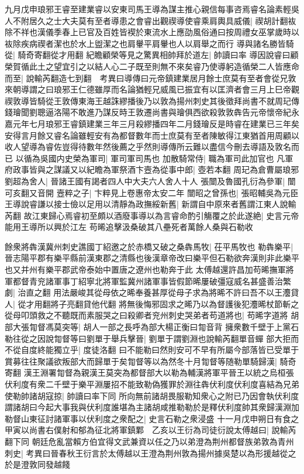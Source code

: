 九月戊申琅邪王睿至建業睿以安東司馬王導為謀主推心親信每事咨焉睿名論素輕吳人不附居久之士大夫莫有至者導患之會睿出觀禊導使睿乘肩輿具威儀|{
	禊胡計翻䘠除不祥也漢儀季春上已官及百姓皆褉於東流水上應劭風俗通曰按周禮女巫掌歲時以䘠除疾病禊者潔也於水上盥潔之也肩轝平肩轝也人以肩舉之而行}
導與諸名勝皆騎從|{
	騎奇寄翻從才用翻}
紀瞻顧榮等見之驚異相帥拜於道左|{
	帥讀曰率}
導因說睿曰顧榮賀循此土之望宜引之以結人心二子既至則無不來矣睿乃使導躬造循榮二人皆應命而至|{
	說輸芮翻造七到翻　考異曰導傳曰元帝鎮建業居月餘士庶莫有至者會從兄敦來朝導謂之曰琅邪王仁德雖厚而名論猶輕兄威風已振宜有以匡濟者會三月上巳帝觀禊敦導皆騎從王敦傳東海王越誅繆播後乃以敦為揚州刺史其後徵拜尚書不就周玘傳錢璯聞劉聰逼洛陽不敢進乃謀反時王敦遷尚書與璯俱西欲殺敦敦犇告元帝懷帝紀永嘉元年七月琅邪王睿鎮建業三年三月殺繆播四年二月錢璯反是時睿在建業已三年矣安得言月餘又睿名論雖輕安有為都督數年而士庶莫有至者陳敏得江東猶首用周顧以收人望導為睿佐豈得待數年然後薦之乎然則導傳所云難以盡信今刪去導語及敦名而已}
以循為吳國内史榮為軍司|{
	軍司軍司馬也}
加散騎常侍|{
	職為軍司此加官也}
凡軍府政事皆與之謀議又以紀瞻為軍祭酒卞壼為從事中郎|{
	壺若本翻}
周玘為倉曹屬琅邪劉超為舍人|{
	晉諸王國有謁者四人中大夫六人舍人十人}
張闓及魯國孔衍為參軍|{
	闓可亥翻又音開}
壼粹之子|{
	卞粹見上卷惠帝太安二年}
闓昭之曾孫也|{
	張昭輔吳為元臣}
王導說睿謙以接士儉以足用以清靜為政撫綏新舊|{
	新謂自中原來者舊謂江東人說輸芮翻}
故江東歸心焉睿初至頗以酒廢事導以為言睿命酌引觴覆之於此遂絶|{
	史言元帝能用王導所以興於江左}
苟晞追擊汲桑破其八壘死者萬餘人桑與石勒收

餘衆將犇漢冀州刺史譙國丁紹邀之於赤橋又破之桑犇馬牧|{
	茌平馬牧也}
勒犇樂平|{
	晉志陽平郡有樂平縣前漢東郡之清縣也後漢章帝改曰樂平但石勒欲奔漢則非此樂平也又并州有樂平郡武帝泰始中置唐之遼州也勒奔于此}
太傅越還許昌加苟晞撫軍將軍都督青兖諸軍事丁紹寧北將軍監冀州諸軍事皆假節晞屢破彊寇威名甚盛善治繁劇|{
	治直之翻}
用法嚴峻其從母依之晞奉養甚厚從母子求為將晞不許曰吾不以王灋貸人|{
	從才用翻將子亮翻貸他代翻}
將無後悔邪固求之晞乃以為督護後犯灋晞杖節斬之從母叩頭救之不聽既而素服哭之曰殺卿者兖州刺史哭弟者苟道將也|{
	苟晞字道將}
胡部大張㔨督馮莫突等|{
	胡人一部之長呼為部大楊正衡曰㔨音背}
擁衆數千壁于上黨石勒往從之因說㔨督等曰劉單于舉兵擊晉|{
	劉單于謂劉淵也說輸芮翻單音蟬}
部大拒而不從自度終能獨立乎|{
	度徒洛翻}
曰不能勒曰然則安可不早有所屬今部落皆已受單于賞募往往聚議欲叛部大而歸單于矣㔨督等以為然冬十月㔨督等随勒單騎歸漢|{
	騎奇寄翻}
漢王淵署㔨督為親漢王莫突為都督部大以勒為輔漢將軍平晉王以統之烏桓張伏利度有衆二千壁于樂平淵屢招不能致勒偽獲罪於淵往犇伏利度伏利度喜結為兄弟使勒帥諸胡寇掠|{
	帥讀曰率下同}
所向無前諸胡畏服勒知衆心之附已乃因會執伏利度謂諸胡曰今起大事我與伏利度誰堪為主諸胡咸推勒勒於是釋伏利度帥其衆歸漢淵加勒督山東征討諸軍事以伏利度之衆配之|{
	史言石勒之衆浸盛}
十一月戊申朔日有食之　甲寅以尚書右僕射和郁為征北將軍鎮鄴　乙亥以王衍為司徒衍說太傅越曰|{
	說輸芮翻下同}
朝廷危亂當賴方伯宜得文武兼資以任之乃以弟澄為荆州都督族弟敦為青州刺史|{
	考異曰晉春秋王衍言於太傅越以王澄為荆州敦為揚州據吳楚以為形援越從之於是澄敦同發越餞}


